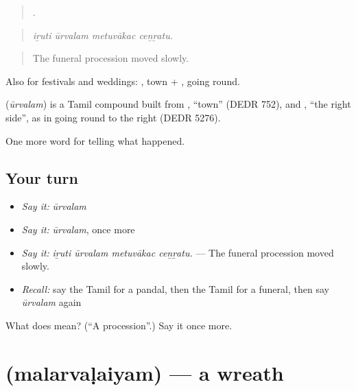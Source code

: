 \begin{quote}
   .
\end{quote}

\begin{quote}
\emph{iṟuti ūrvalam metuvākac ceṉṟatu.}
\end{quote}

\begin{quote}
The funeral procession moved slowly.
\end{quote}

Also for festivals and weddings: , town + , going round.

\begin{cousinweb}
\textbf{} (\emph{ūrvalam}) is a Tamil compound built from , \textquotedblleft{}town\textquotedblright{} (DEDR 752), and , \textquotedblleft{}the right side\textquotedblright{}, as in going round to the right (DEDR 5276).
\end{cousinweb}

\begin{grammarlens}[title={What you've built}]
One more word for telling what happened.
\end{grammarlens}

\subsection*{Your turn}
\begin{itemize}
\raggedright
  \item \emph{Say it:} \emph{ūrvalam}
  \item \emph{Say it:} \emph{ūrvalam}, once more
  \item \emph{Say it:} \emph{iṟuti ūrvalam metuvākac ceṉṟatu.} — The funeral procession moved slowly.
  \item \emph{Recall:} say the Tamil for a pandal, then the Tamil for a funeral, then say \emph{ūrvalam} again
\end{itemize}

\begin{tcolorbox}[breakable,colback=teal!4,colframe=teal!35!black,title={Before you move on}]
What does  mean? (\textquotedblleft{}A procession\textquotedblright{}.) Say it once more.
\end{tcolorbox}
\section[\texorpdfstring{\ta{மலர்வளையம்} (malarvaḷaiyam)}{மலர்வளையம் (malarvaḷaiyam)}]{ (malarvaḷaiyam) — a wreath}

